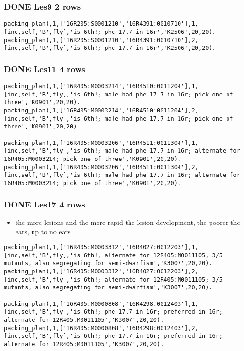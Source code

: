 \documentclass[11pt]{article}
\begin{document}
\subsubsection{{\bfseries\sffamily DONE} Les9  2 rows}
\label{sec-4-1-5}

\begin{verbatim}
packing_plan(,1,['16R205:S0001210','16R4391:0010710'],1,[inc,self,'B',fly],'is 6th!; phe 17.7 in 16r','K2506',20,20).
packing_plan(,1,['16R205:S0001210','16R4391:0010710'],2,[inc,self,'B',fly],'is 6th!; phe 17.7 in 16r','K2506',20,20).
\end{verbatim}


\subsubsection{{\bfseries\sffamily DONE} Les11 4 rows}
\label{sec-4-1-6}

\begin{verbatim}
packing_plan(,1,['16R405:M0003214','16R4510:0011204'],1,[inc,self,'B',fly],'is 6th!; male had phe 17.7 in 16r; pick one of three','K0901',20,20).
packing_plan(,1,['16R405:M0003214','16R4510:0011204'],2,[inc,self,'B',fly],'is 6th!; male had phe 17.7 in 16r; pick one of three','K0901',20,20).

packing_plan(,1,['16R405:M0003206','16R4511:0011304'],1,[inc,self,'B',fly],'is 6th!; male had phe 17.7 in 16r; alternate for 16R405:M0003214; pick one of three','K0901',20,20).
packing_plan(,1,['16R405:M0003206','16R4511:0011304'],2,[inc,self,'B',fly],'is 6th!; male had phe 17.7 in 16r; alternate for 16R405:M0003214; pick one of three','K0901',20,20).
\end{verbatim}


\subsubsection{{\bfseries\sffamily DONE} Les17 4 rows}
\label{sec-4-1-7}


\begin{itemize}
\item the more lesions and the more rapid the lesion development, the poorer
the ears, up to no ears
\end{itemize}


\begin{verbatim}
packing_plan(,1,['16R405:M0003312','16R4027:0012203'],1,[inc,self,'B',fly],'is 6th!; alternate for 12R405:M0011105; 3/5 mutants, also segregating for semi-dwarfism','K3007',20,20).
packing_plan(,1,['16R405:M0003312','16R4027:0012203'],2,[inc,self,'B',fly],'is 6th!; alternate for 12R405:M0011105; 3/5 mutants, also segregating for semi-dwarfism','K3007',20,20).

packing_plan(,1,['16R405:M0000808','16R4298:0012403'],1,[inc,self,'B',fly],'is 6th!; phe 17.7 in 16r; preferred in 16r; alternate for 12R405:M0011105','K3007',20,20).
packing_plan(,1,['16R405:M0000808','16R4298:0012403'],2,[inc,self,'B',fly],'is 6th!; phe 17.7 in 16r; preferred in 16r; alternate for 12R405:M0011105','K3007',20,20).
\end{verbatim}
\end{document}
